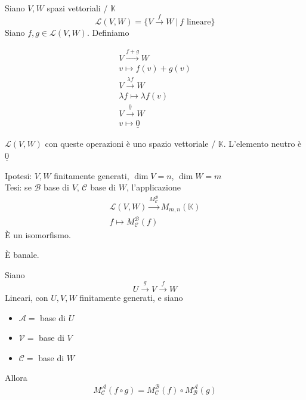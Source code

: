 Siano $V,W$ spazi vettoriali / $\mathbb{K}$
\begin{equation}
    \mathscr{L}(V,W) = \{V\xrightarrow{f} W\ |\ f \text{ lineare}\}
\end{equation}
Siano $f,g\in \mathscr{L}(V,W)$. Definiamo
\begin{notazione}
    \begin{gather}
        V\xrightarrow{f+g} W \\
        v\mapsto f(v)+g(v) \\
        V\xrightarrow{\lambda f} W \\
        \lambda f \mapsto \lambda f(v) \\
        V\xrightarrow{\underline{0}} W \\
        v\mapsto \underline{0}
    \end{gather}
\end{notazione}
$\mathscr{L}(V,W)$ con queste operazioni è uno spazio vettoriale / $\mathbb{K}$. L'elemento neutro è $\underline{0}$

\begin{proposizione}
    Ipotesi: $V,W$ finitamente generati, $\dim V = n$, $\dim W = m$ \\
    Tesi: se $\mathscr{B}$ base di $V$, $\mathscr{C}$ base di $W$, l'applicazione
    \begin{gather}
        \mathscr{L}(V,W) \xrightarrow{M_{\mathscr{C}}^{\mathscr{B}}} M_{m,n}(\mathbb{K}) \\
        f\mapsto M_{\mathscr{C}}^{\mathscr{B}}(f)
    \end{gather}
    È un isomorfismo.
\end{proposizione}

\begin{dimostrazione}
    È banale.
\end{dimostrazione}

\begin{proposizione}
    Siano
    \begin{equation}
        U\xrightarrow{g} V\xrightarrow{f} W
    \end{equation}
    Lineari, con $U,V,W$ finitamente generati, e siano
    \begin{itemize}
        \item $\mathscr{A} =$ base di $U$
        \item $\mathscr{V} =$ base di $V$
        \item $\mathscr{C} =$ base di $W$
    \end{itemize}

    Allora
    \begin{equation}
        M_{\mathscr{C}}^{\mathscr{A}}(f\circ g) = M_{\mathscr{C}}^{\mathscr{B}}(f) \circ M_{\mathscr{B}}^{\mathscr{A}}(g)
    \end{equation}
\end{proposizione}


